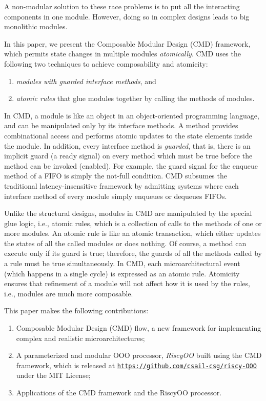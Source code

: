 \documentclass[conference]{IEEEtran}
\begin{document}
A non-modular solution to these race problems is to put all the interacting components in one module.
However, doing so in complex designs leads to big monolithic modules.

In this paper, we present the Composable Modular Design (CMD) framework, which permits state changes in multiple modules \emph{atomically}.
CMD uses the following two techniques to achieve composability and atomicity:
\begin{enumerate}
    \item \emph{modules with guarded interface methods}, and
    \item \emph{atomic rules} that glue modules together by calling the methods of modules.
\end{enumerate}

In CMD, a module is like an object in an object-oriented programming language, and can be manipulated only by its interface methods.
A method provides combinational access and performs atomic updates to the state elements inside the module.
In addition, every interface method is \emph{guarded}, that is, there is an implicit guard (a ready signal) on every method which must be true before the method can be invoked (enabled).
For example, the guard signal for the enqueue method of a FIFO is simply the not-full condition.
CMD subsumes the traditional latency-insensitive framework by admitting systems where each interface method of every module simply enqueues or dequeues FIFOs.

Unlike the structural designs, modules in CMD are manipulated by the special glue logic, i.e., atomic rules, which is a collection of calls to the methods of one or more modules.
An atomic rule is like an atomic transaction, which either updates the states of all the called modules  or does nothing.
Of course, a method can execute only if its guard is true; therefore, the guards of all the methods called by a rule must be true simultaneously.
In CMD, each microarchitectural event (which happens in a single cycle) is expressed as an atomic rule.
Atomicity ensures that refinement of a module will not affect how it is used by the rules, i.e., modules are much more composable.

This paper makes the following contributions:
\begin{enumerate}
    \item Composable Modular Design (CMD) flow, a new framework for implementing complex and realistic microarchitectures;
    
    \item A parameterized and modular OOO processor, \emph{RiscyOO} built using the CMD framework, which is released at \texttt{\url{https://github.com/csail-csg/riscy-OOO}} under the MIT License;
    
    \item Applications of the CMD framework and the RiscyOO processor.
\end{enumerate}
\end{document}
